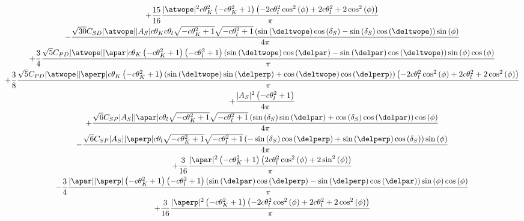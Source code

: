 {\begin{multline}
+\frac{15}{16} \frac{|\atwope|^{2} c\theta_{K}^{2} \left(- c\theta_{K}^{2} + 1\right) \left(- 2 c\theta_{l}^{2} \operatorname{cos}^{2}\left(\phi\right) + 2 c\theta_{l}^{2} + 2 \operatorname{cos}^{2}\left(\phi\right)\right)}{\pi} \\ 
- \frac{\sqrt{30} C_{{SD}} |\atwope| |A_{S}| c\theta_{K} c\theta_{l} \sqrt{- c\theta_{K}^{2} + 1} \sqrt{- c\theta_{l}^{2} + 1} \left(\operatorname{sin}\left(\deltwope\right) \operatorname{cos}\left(\delta_{S}\right) - \operatorname{sin}\left(\delta_{S}\right) \operatorname{cos}\left(\deltwope\right)\right) \operatorname{sin}\left(\phi\right)}{4 \pi} \\
+\frac{3}{4} \frac{\sqrt{5} C_{{PD}} |\atwope| |\apar| c\theta_{K} \left(- c\theta_{K}^{2} + 1\right) \left(- c\theta_{l}^{2} + 1\right) \left(\operatorname{sin}\left(\deltwope\right) \operatorname{cos}\left(\delpar\right) - \operatorname{sin}\left(\delpar\right) \operatorname{cos}\left(\deltwope\right)\right) \operatorname{sin}\left(\phi\right) \operatorname{cos}\left(\phi\right)}{\pi} \\ 
+\frac{3}{8} \frac{\sqrt{5} C_{{PD}} |\atwope| |\aperp| c\theta_{K} \left(- c\theta_{K}^{2} + 1\right) \left(\operatorname{sin}\left(\deltwope\right) \operatorname{sin}\left(\delperp\right) + \operatorname{cos}\left(\deltwope\right) \operatorname{cos}\left(\delperp\right)\right) \left(- 2 c\theta_{l}^{2} \operatorname{cos}^{2}\left(\phi\right) + 2 c\theta_{l}^{2} + 2 \operatorname{cos}^{2}\left(\phi\right)\right)}{\pi} \\ 
+\frac{|A_{S}|^{2} \left(- c\theta_{l}^{2} + 1\right)}{4 \pi} \\ 
+\frac{\sqrt{6} C_{{SP}} |A_{S}| |\apar| c\theta_{l} \sqrt{- c\theta_{K}^{2} + 1} \sqrt{- c\theta_{l}^{2} + 1} \left(\operatorname{sin}\left(\delta_{S}\right) \operatorname{sin}\left(\delpar\right) + \operatorname{cos}\left(\delta_{S}\right) \operatorname{cos}\left(\delpar\right)\right) \operatorname{cos}\left(\phi\right)}{4 \pi} \\ 
- \frac{\sqrt{6} C_{{SP}} |A_{S}| |\aperp| c\theta_{l} \sqrt{- c\theta_{K}^{2} + 1} \sqrt{- c\theta_{l}^{2} + 1} \left(- \operatorname{sin}\left(\delta_{S}\right) \operatorname{cos}\left(\delperp\right) + \operatorname{sin}\left(\delperp\right) \operatorname{cos}\left(\delta_{S}\right)\right) \operatorname{sin}\left(\phi\right)}{4 \pi} \\ 
+\frac{3}{16} \frac{|\apar|^{2} \left(- c\theta_{K}^{2} + 1\right) \left(2 c\theta_{l}^{2} \operatorname{cos}^{2}\left(\phi\right) + 2 \operatorname{sin}^{2}\left(\phi\right)\right)}{\pi} \\ 
- \frac{3}{4} \frac{|\apar| |\aperp| \left(- c\theta_{K}^{2} + 1\right) \left(- c\theta_{l}^{2} + 1\right) \left(\operatorname{sin}\left(\delpar\right) \operatorname{cos}\left(\delperp\right) - \operatorname{sin}\left(\delperp\right) \operatorname{cos}\left(\delpar\right)\right) \operatorname{sin}\left(\phi\right) \operatorname{cos}\left(\phi\right)}{\pi} \\ 
+\frac{3}{16} \frac{|\aperp|^{2} \left(- c\theta_{K}^{2} + 1\right) \left(- 2 c\theta_{l}^{2} \operatorname{cos}^{2}\left(\phi\right) + 2 c\theta_{l}^{2} + 2 \operatorname{cos}^{2}\left(\phi\right)\right)}{\pi} \\ 
\end{multline}
}
